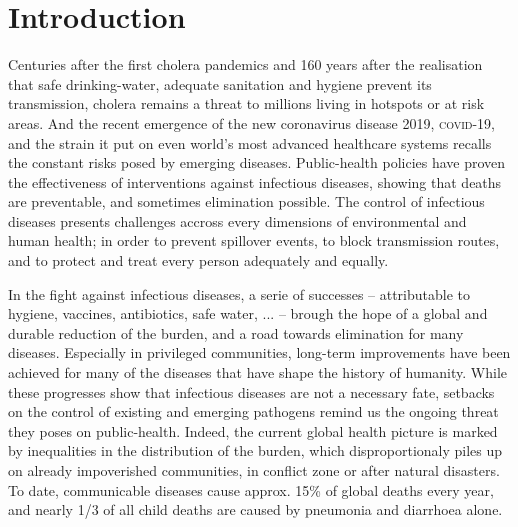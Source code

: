 \chapter*{Introduction} %
 Centuries after the first cholera pandemics and 160 years after the realisation that safe drinking-water, adequate sanitation and hygiene prevent its transmission, cholera remains a threat to millions living in hotspots or at risk areas. And the recent emergence of the new coronavirus disease 2019, \textsc{covid}-19, and the strain it put on even world's most advanced healthcare systems recalls the constant risks posed by emerging diseases. Public-health policies have proven the effectiveness of interventions against infectious diseases, showing that deaths are preventable, and sometimes elimination possible. The control of infectious diseases presents challenges accross every dimensions of environmental and human health; in order to prevent spillover events, to block transmission routes, and to protect and treat every person adequately and equally. 

In the fight against infectious diseases, a serie of successes -- attributable to \eg hygiene, vaccines, antibiotics, safe water, ... -- brough the hope of a global and durable reduction of the burden, and a road towards elimination for many diseases. Especially in privileged communities, long-term improvements have been achieved for many of the diseases that have shape the history of humanity. While these progresses show that infectious diseases are not a necessary fate, setbacks on the control of existing and emerging pathogens remind us the ongoing threat they poses on public-health. Indeed, the current global health picture is marked by inequalities in the distribution of the burden, which disproportionaly piles up on already impoverished communities, in conflict zone or after natural disasters. To date, communicable diseases cause approx. 15\% of global deaths every year\cite[-4\baselineskip][tab. 1, excl. non-transmissible neonatal and maternal diseases and nutritional diseases; pre-\textsc{covid}-19 estimates]{Roth:GlobalRegionalNational:2018}, and nearly 1/3 of all child deaths are caused by pneumonia and diarrhoea alone\cite[][\textsc{M} deaths among under 5, every year.]{WHO:EndingPreventableChild:2013}.
 
